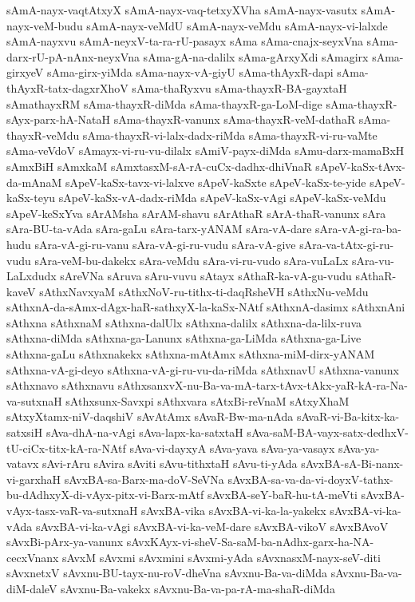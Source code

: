 {sAmA-nayx-vaqtAtxyX
sAmA-nayx-vaq-tetxyXVha
sAmA-nayx-vasutx
sAmA-nayx-veM-budu
sAmA-nayx-veMdU
sAmA-nayx-veMdu
sAmA-nayx-vi-lalxde
sAmA-nayxvu
sAmA-neyxV-ta-ra-rU-pasayx
sAma
sAma-cnajx-seyxVna
sAma-darx-rU-pA-nAnx-neyxVna
sAma-gA-na-dalilx
sAma-gArxyXdi
sAmagirx
sAma-girxyeV
sAma-girx-yiMda
sAma-nayx-vA-giyU
sAma-thAyxR-dapi
sAma-thAyxR-tatx-dagxrXhoV
sAma-thaRyxvu
sAma-thayxR-BA-gayxtaH
sAmathayxRM
sAma-thayxR-diMda
sAma-thayxR-ga-LoM-dige
sAma-thayxR-sAyx-parx-hA-NataH
sAma-thayxR-vanunx
sAma-thayxR-veM-dathaR
sAma-thayxR-veMdu
sAma-thayxR-vi-lalx-dadx-riMda
sAma-thayxR-vi-ru-vaMte
sAma-veVdoV
sAmayx-vi-ru-vu-dilalx
sAmiV-payx-diMda
sAmu-darx-mamaBxH
sAmxBiH
sAmxkaM
sAmxtasxM-sA-rA-cuCx-dadhx-dhiVnaR
sApeV-kaSx-tAvx-da-mAnaM
sApeV-kaSx-tavx-vi-lalxve
sApeV-kaSxte
sApeV-kaSx-te-yide
sApeV-kaSx-teyu
sApeV-kaSx-vA-dadx-riMda
sApeV-kaSx-vAgi
sApeV-kaSx-veMdu
sApeV-keSxYva
sArAMsha
sArAM-shavu
sArAthaR
sArA-thaR-vanunx
sAra
sAra-BU-ta-vAda
sAra-gaLu
sAra-tarx-yANAM
sAra-vA-dare
sAra-vA-gi-ra-ba-hudu
sAra-vA-gi-ru-vanu
sAra-vA-gi-ru-vudu
sAra-vA-give
sAra-va-tAtx-gi-ru-vudu
sAra-veM-bu-dakekx
sAra-veMdu
sAra-vi-ru-vudo
sAra-vuLaLx
sAra-vu-LaLxdudx
sAreVNa
sAruva
sAru-vuvu
sAtayx
sAthaR-ka-vA-gu-vudu
sAthaR-kaveV
sAthxNavxyaM
sAthxNoV-ru-tithx-ti-daqRsheVH
sAthxNu-veMdu
sAthxnA-da-sAmx-dAgx-haR-sathxyX-la-kaSx-NAtf
sAthxnA-dasimx
sAthxnAni
sAthxna
sAthxnaM
sAthxna-dalUlx
sAthxna-dalilx
sAthxna-da-lilx-ruva
sAthxna-diMda
sAthxna-ga-Lanunx
sAthxna-ga-LiMda
sAthxna-ga-Live
sAthxna-gaLu
sAthxnakekx
sAthxna-mAtAmx
sAthxna-miM-dirx-yANAM
sAthxna-vA-gi-deyo
sAthxna-vA-gi-ru-vu-da-riMda
sAthxnavU
sAthxna-vanunx
sAthxnavo
sAthxnavu
sAthxsanxvX-nu-Ba-va-mA-tarx-tAvx-tAkx-yaR-kA-ra-Na-va-sutxnaH
sAthxsunx-Savxpi
sAthxvara
sAtxBi-reVnaM
sAtxyXhaM
sAtxyXtamx-niV-daqshiV
sAvAtAmx
sAvaR-Bw-ma-nAda
sAvaR-vi-Ba-kitx-ka-satxsiH
sAva-dhA-na-vAgi
sAva-lapx-ka-satxtaH
sAva-saM-BA-vayx-satx-dedhxV-tU-ciCx-titx-kA-ra-NAtf
sAva-vi-dayxyA
sAva-yava
sAva-ya-vasayx
sAva-ya-vatavx
sAvi-rAru
sAvira
sAviti
sAvu-tithxtaH
sAvu-ti-yAda
sAvxBA-sA-Bi-nanx-vi-garxhaH
sAvxBA-sa-Barx-ma-doV-SeVNa
sAvxBA-sa-va-da-vi-doyxV-tathx-bu-dAdhxyX-di-vAyx-pitx-vi-Barx-mAtf
sAvxBA-seY-baR-hu-tA-meVti
sAvxBA-vAyx-tasx-vaR-va-sutxnaH
sAvxBA-vika
sAvxBA-vi-ka-la-yakekx
sAvxBA-vi-ka-vAda
sAvxBA-vi-ka-vAgi
sAvxBA-vi-ka-veM-dare
sAvxBA-vikoV
sAvxBAvoV
sAvxBi-pArx-ya-vanunx
sAvxKAyx-vi-sheV-Sa-saM-ba-nAdhx-garx-ha-NA-cecxVnanx
sAvxM
sAvxmi
sAvxmini
sAvxmi-yAda
sAvxnasxM-nayx-seV-diti
sAvxnetxV
sAvxnu-BU-tayx-nu-roV-dheVna
sAvxnu-Ba-va-diMda
sAvxnu-Ba-va-diM-daleV
sAvxnu-Ba-vakekx
sAvxnu-Ba-va-pa-rA-ma-shaR-diMda
}
